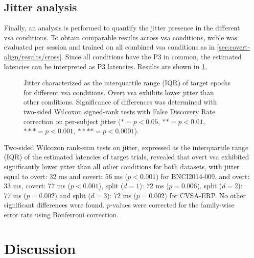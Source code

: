 \subsection{Jitter analysis}
\label{sec:covert-align/results/jitter}
Finally, an analysis is performed to quantify the jitter presence in the
different \ac{vsa} conditions.
To obtain comparable results across \ac{vsa} conditions, \ac{wcble} was
evaluated per session and trained on all combined \ac{vsa} conditions as in
\cref{sec:covert-align/results/cross}.
Since all conditions have the P3 in common, the estimated latencies can be
interpreted as P3 latencies.
Results are shown in \cref{fig:jitter}.
\begin{figure}[t!]
    
    \caption[Estimated jitter]{ Jitter characterized as the interquartile range (IQR)
	of target epochs for different \ac{vsa} conditions. Overt \ac{vsa} exhibits lower
   jitter than other conditions.
   Significance of differences
   was determined with two-sided Wilcoxon signed-rank tests with False Discovery
   Rate correction on per-subject jitter ($*= p<0.05$, $**=p<0.01$,
   $***=p<0.001$, $****=p<0.0001$).}
		\label{fig:jitter}
\end{figure}


Two-sided Wilcoxon rank-sum tests on jitter, expressed as the interquartile
range (IQR) of the estimated latencies of target trials, revealed that overt
\ac{vsa} exhibited significantly lower jitter than all other conditions for
both datasets, with jitter equal to overt: 32 ms and covert:
56 ms ($p<0.001$) for BNCI2014-009, and overt: 33 ms, covert: 77 ms ($p<0.001$),
split ($d=1$): 72 ms ($p=0.006$),
split ($d=2$): 77 ms ($p=0.002$)
and split ($d=3$): 72 ms ($p=0.002$)
for CVSA-ERP.
No other significant differences were found.
$p$-values were corrected for the family-wise error rate using Bonferroni
correction.

\section{Discussion}

